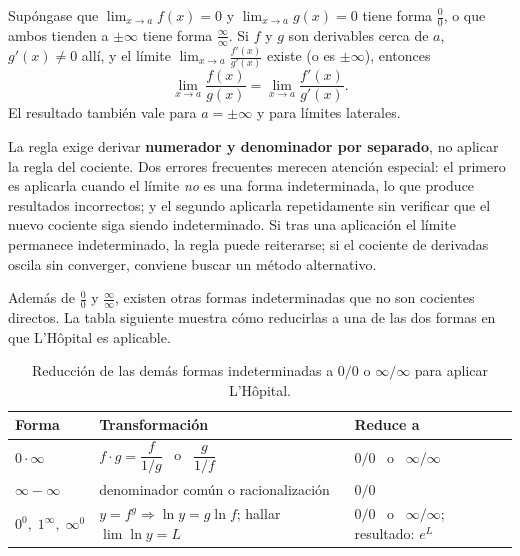 \begin{theorem}
Supóngase que $\lim_{x\to a}f(x)=0$ y $\lim_{x\to a}g(x)=0$ tiene forma
$\frac{0}{0}$, o que ambos tienden a $\pm\infty$ tiene forma
$\frac{\infty}{\infty}$. Si $f$ y $g$ son derivables cerca de $a$,
$g'(x)\neq 0$ allí, y el límite $\lim_{x\to a}\frac{f'(x)}{g'(x)}$
existe (o es $\pm\infty$), entonces
\[
\lim_{x\to a}\frac{f(x)}{g(x)} = \lim_{x\to a}\frac{f'(x)}{g'(x)}.
\]
El resultado también vale para $a=\pm\infty$ y para límites laterales.
\end{theorem}

\begin{rem}
La regla exige derivar \textbf{numerador y denominador por separado},
no aplicar la regla del cociente. Dos errores frecuentes merecen
atención especial: el primero es aplicarla cuando el límite \emph{no} es una
forma indeterminada, lo que produce resultados incorrectos; y el segundo aplicarla
repetidamente sin verificar que el nuevo cociente siga siendo
indeterminado. Si tras una aplicación el límite permanece indeterminado,
la regla puede reiterarse; si el cociente de derivadas oscila sin
converger, conviene buscar un método alternativo.
\end{rem}

Además de $\frac{0}{0}$ y $\frac{\infty}{\infty}$, existen otras formas
indeterminadas que no son cocientes directos. La tabla siguiente muestra
cómo reducirlas a una de las dos formas en que L'Hôpital es aplicable.

\begin{table}[H]
\centering
\renewcommand{\arraystretch}{1.6}
\begin{tabular}{l l l}
\toprule
\textbf{Forma} & \textbf{Transformación} & \textbf{Reduce a} \\
\midrule
$0\cdot\infty$ &
  $f\cdot g = \dfrac{f}{1/g}$ \ o \ $\dfrac{g}{1/f}$ &
  $0/0$ \ o \ $\infty/\infty$ \\
$\infty-\infty$ &
  denominador común o racionalización &
  $0/0$ \\
$0^0,\;1^\infty,\;\infty^0$ &
  $y=f^g \Rightarrow \ln y = g\ln f$; hallar $\lim\ln y = L$ &
  $0/0$ \ o \ $\infty/\infty$; resultado: $e^L$ \\
\bottomrule
\end{tabular}
\caption{Reducción de las demás formas indeterminadas a $0/0$ o $\infty/\infty$ para aplicar L'Hôpital.}
\end{table}

